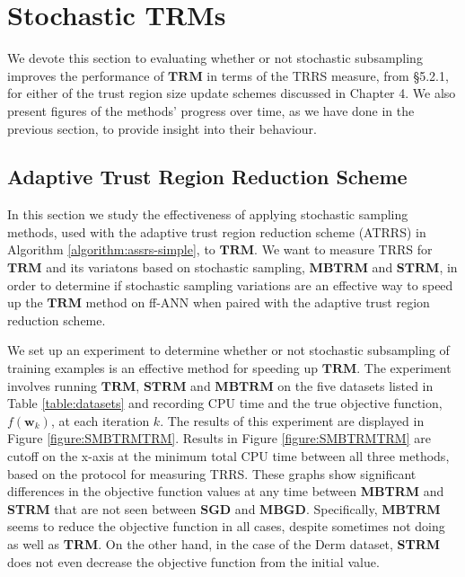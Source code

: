 \documentclass[letterpaper,12pt,titlepage,oneside,final]{book}
\begin{document}
	\section{Stochastic TRMs}
	
	We devote this section to evaluating whether or not stochastic subsampling improves the performance of $\mathbf{TRM}$ in terms of the TRRS measure, from \S{5.2.1}, for either of the trust region size update schemes discussed in Chapter 4. We also present figures of the methods' progress over time, as we have done in the previous section, to provide insight into their behaviour.
	
	\subsection{Adaptive Trust Region Reduction Scheme}
	
	In this section we study the effectiveness of applying stochastic sampling methods, used with the adaptive trust region reduction scheme (ATRRS) in Algorithm \ref{algorithm:assrs-simple}, to $\mathbf{TRM}$. We want to measure TRRS for $\mathbf{TRM}$ and its variatons based on stochastic sampling, $\mathbf{MBTRM}$ and $\mathbf{STRM}$, in order to determine if stochastic sampling variations are an effective way to speed up the $\mathbf{TRM}$ method on ff-ANN when paired with the adaptive trust region reduction scheme. 

	We set up an experiment to determine whether or not stochastic subsampling of training examples is an effective method for speeding up $\mathbf{TRM}$. The experiment involves running $\mathbf{TRM}$, $\mathbf{STRM}$ and $\mathbf{MBTRM}$ on the five datasets listed in Table \ref{table:datasets} and recording CPU time and the true objective function, $f(\mathbf{w}_{k})$, at each iteration $k$. The results of this experiment are displayed in Figure \ref{figure:SMBTRMTRM}. Results in Figure \ref{figure:SMBTRMTRM} are cutoff on the x-axis at the minimum total CPU time between all three methods, based on the protocol for measuring TRRS. These graphs show significant differences in the objective function values at any time between \textbf{MBTRM} and \textbf{STRM} that are not seen between $\mathbf{SGD}$ and $\mathbf{MBGD}$. Specifically, $\mathbf{MBTRM}$ seems to reduce the objective function in all cases, despite sometimes not doing as well as \textbf{TRM}. On the other hand, in the case of the Derm dataset, \textbf{STRM} does not even decrease the objective function from the initial value. 
	
\end{document}

